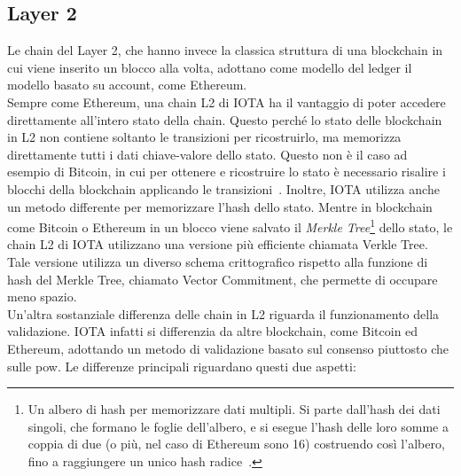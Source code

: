 \documentclass[12pt,a4paper,openright,twoside]{report}
\begin{document}
\subsection{Layer 2}
Le chain del Layer 2, che hanno invece la classica struttura di una blockchain in cui viene inserito un blocco alla volta, adottano come modello del ledger il modello basato su account, come Ethereum.\\
Sempre come Ethereum, una chain L2 di IOTA ha il vantaggio di poter accedere direttamente all'intero stato della chain. Questo perché lo stato delle blockchain in L2 non contiene soltanto le transizioni per ricostruirlo, ma memorizza direttamente tutti i dati chiave-valore dello stato. Questo non è il caso ad esempio di Bitcoin, in cui per ottenere e ricostruire lo stato è necessario risalire i blocchi della blockchain applicando le transizioni~\cite{bitcoinethereum}. 
\label{verkletree}Inoltre, IOTA utilizza anche un metodo differente per memorizzare l'hash dello stato. Mentre in blockchain come Bitcoin o Ethereum in un blocco viene salvato il \textit{Merkle Tree}\footnote{Un albero di hash per memorizzare dati multipli. Si parte dall'hash dei dati singoli, che formano le foglie dell'albero, e si esegue l'hash delle loro somme a coppia di due (o più, nel caso di Ethereum sono 16) costruendo così l'albero, fino a raggiungere un unico hash radice~\cite{merkletree}.} dello stato, le chain L2 di IOTA utilizzano una versione più efficiente chiamata Verkle Tree. Tale versione utilizza un diverso schema crittografico rispetto alla funzione di hash del Merkle Tree, chiamato Vector Commitment, che permette di occupare meno spazio.\\
Un'altra sostanziale differenza delle chain in L2 riguarda il funzionamento della validazione. IOTA infatti si differenzia da altre blockchain, come Bitcoin ed Ethereum, adottando un metodo di validazione basato sul consenso piuttosto che sulle \acrlong{pow}. Le differenze principali riguardano questi due aspetti:
\end{document}
